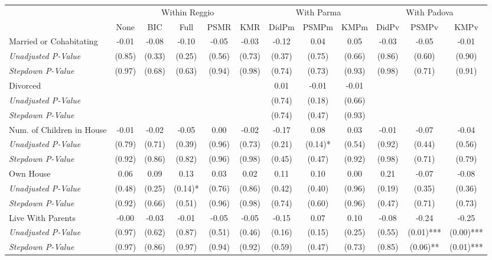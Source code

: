 \begin{tabular}{l c c c c c c c c c c c}
\toprule
& \multicolumn{5}{c}{Within Reggio} & \multicolumn{3}{c}{With Parma} & \multicolumn{3}{c}{With Padova} \\\cmidrule(lr){2-6} \cmidrule(lr){7-9} \cmidrule(lr){10-12}
 & None & BIC & Full & PSMR & KMR & DidPm & PSMPm & KMPm & DidPv & PSMPv & KMPv \\
\midrule
Married or Cohabitating & -0.01 & -0.08 & -0.10 & -0.05 & -0.03 & -0.12 & 0.04 & 0.05 & -0.03 & -0.05 & -0.01 \\
\quad \textit{Unadjusted P-Value} & (0.85) & (0.33) & (0.25) & (0.56) & (0.73) & (0.37) & (0.75) & (0.66) & (0.86) & (0.60) & (0.90) \\
\quad \textit{Stepdown P-Value} & (0.97) & (0.68) & (0.63) & (0.94) & (0.98) & (0.74) & (0.73) & (0.93) & (0.98) & (0.71) & (0.91) \\
Divorced &  &  &  &  &  & 0.01 & -0.01 & -0.01 &  &  &  \\
\quad \textit{Unadjusted P-Value} & & & & & & (0.74) & (0.18) & (0.66) & & & \\
\quad \textit{Stepdown P-Value} &  &  &  &  &  & (0.74) & (0.47) & (0.93) &  &  &  \\
Num. of Children in House & -0.01 & -0.02 & -0.05 & 0.00 & -0.02 & -0.17 & 0.08 & 0.03 & -0.01 & -0.07 & -0.04 \\
\quad \textit{Unadjusted P-Value} & (0.79) & (0.71) & (0.39) & (0.96) & (0.73) & (0.21) & (0.14)* & (0.54) & (0.92) & (0.44) & (0.56) \\
\quad \textit{Stepdown P-Value} & (0.92) & (0.86) & (0.82) & (0.96) & (0.98) & (0.45) & (0.47) & (0.92) & (0.98) & (0.71) & (0.79) \\
Own House & 0.06 & 0.09 & 0.13 & 0.03 & 0.02 & 0.11 & 0.10 & 0.00 & 0.21 & -0.07 & -0.08 \\
\quad \textit{Unadjusted P-Value} & (0.48) & (0.25) & (0.14)* & (0.76) & (0.86) & (0.42) & (0.40) & (0.96) & (0.19) & (0.35) & (0.36) \\
\quad \textit{Stepdown P-Value} & (0.92) & (0.66) & (0.51) & (0.96) & (0.98) & (0.74) & (0.60) & (0.96) & (0.47) & (0.71) & (0.73) \\
Live With Parents & -0.00 & -0.03 & -0.01 & -0.05 & -0.05 & -0.15 & 0.07 & 0.10 & -0.08 & -0.24 & -0.25 \\
\quad \textit{Unadjusted P-Value} & (0.97) & (0.62) & (0.87) & (0.51) & (0.46) & (0.16) & (0.15) & (0.25) & (0.55) & (0.01)*** & (0.00)*** \\
\quad \textit{Stepdown P-Value} & (0.97) & (0.86) & (0.97) & (0.94) & (0.92) & (0.59) & (0.47) & (0.73) & (0.85) & (0.06)** & (0.01)*** \\
\bottomrule
\end{tabular}
